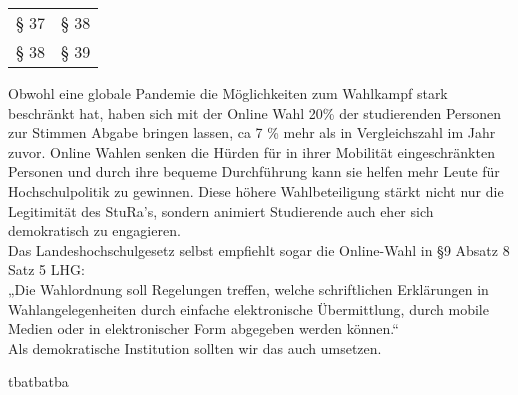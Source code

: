 {\begin{longtable}{|p{7.5cm}|p{7.5cm}|}
        § 37 & § 38 \\
        § 38 & § 39 \\
    \end{longtable}
}{
    Obwohl eine globale Pandemie die Möglichkeiten zum Wahlkampf stark beschränkt hat, haben sich mit der Online Wahl 20\% der studierenden Personen zur Stimmen Abgabe bringen lassen, ca 7 \% mehr als in Vergleichszahl im Jahr zuvor. Online Wahlen senken die Hürden für in ihrer Mobilität eingeschränkten Personen und durch ihre bequeme Durchführung kann sie helfen mehr Leute für Hochschulpolitik zu gewinnen. Diese höhere Wahlbeteiligung stärkt nicht nur die Legitimität des StuRa's, sondern animiert Studierende auch eher sich demokratisch zu engagieren.\\
    Das Landeshochschulgesetz selbst empfiehlt sogar die Online-Wahl in §9 Absatz 8 Satz 5 LHG:\\
    „Die Wahlordnung soll Regelungen treffen, welche schriftlichen Erklärungen in Wahlangelegenheiten durch einfache elektronische Übermittlung, durch mobile Medien oder in elektronischer Form abgegeben werden können.“\\
    Als demokratische Institution sollten wir das auch umsetzen.
}{

}{tba}{tba}{tba}

